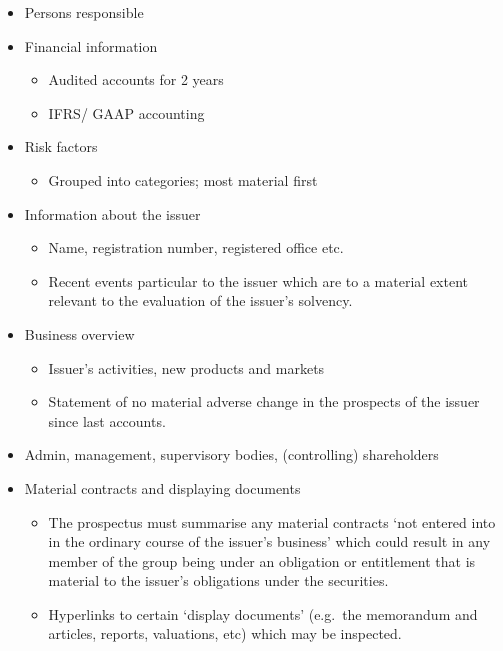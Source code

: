 \documentclass[
]{article}
\providecommand{\tightlist}{%
  \setlength{\itemsep}{0pt}\setlength{\parskip}{0pt}}
\begin{document}
\begin{itemize}
\tightlist
\item
  Persons responsible
\item
  Financial information

  \begin{itemize}
  \tightlist
  \item
    Audited accounts for 2 years
  \item
    IFRS/ GAAP accounting
  \end{itemize}
\item
  Risk factors

  \begin{itemize}
  \tightlist
  \item
    Grouped into categories; most material first
  \end{itemize}
\item
  Information about the issuer

  \begin{itemize}
  \tightlist
  \item
    Name, registration number, registered office etc.
  \item
    Recent events particular to the issuer which are to a material
    extent relevant to the evaluation of the issuer's solvency.
  \end{itemize}
\item
  Business overview

  \begin{itemize}
  \tightlist
  \item
    Issuer's activities, new products and markets
  \item
    Statement of no material adverse change in the prospects of the
    issuer since last accounts.
  \end{itemize}
\item
  Admin, management, supervisory bodies, (controlling) shareholders
\item
  Material contracts and displaying documents

  \begin{itemize}
  \tightlist
  \item
    The prospectus must summarise any material contracts `not entered
    into in the ordinary course of the issuer's business' which could
    result in any member of the group being under an obligation or
    entitlement that is material to the issuer's obligations under the
    securities.
  \item
    Hyperlinks to certain `display documents' (e.g.~the memorandum and
    articles, reports, valuations, etc) which may be inspected.
  \end{itemize}
\end{itemize}
\end{document}
